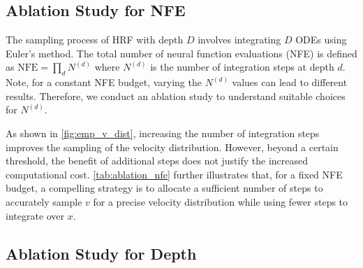 \subsection{Ablation Study for NFE}
The sampling process of HRF with depth $D$ involves integrating $D$ ODEs using Euler's method. The total number of neural function evaluations (NFE) is defined as $\text{NFE}=\prod_d N^{(d)}$ where $N^{(d)}$ is the number of integration steps at depth $d$. Note, for a constant NFE budget, varying the $N^{(d)}$ values can lead to different results. Therefore, we conduct an ablation study to understand suitable choices for $N^{(d)}$. 

As shown in \cref{fig:emp_v_dist}, increasing the number of integration steps improves the sampling of the velocity distribution. %
However, beyond a certain threshold, the benefit of additional steps does not justify the increased computational cost. \cref{tab:ablation_nfe} further illustrates that, for a fixed NFE budget, a compelling strategy is to allocate a sufficient number of steps to accurately sample $v$ for a precise velocity distribution while using fewer steps to integrate over $x$. 

\subsection{Ablation Study for Depth}
\begin{table}[t]
\centering
{}
\caption{Computational requirements for training on synthetic datasets. All models in this table are trained for 15000 iterations with a batch size of 51200. }
\label{tab:training_syn}
\end{table}

